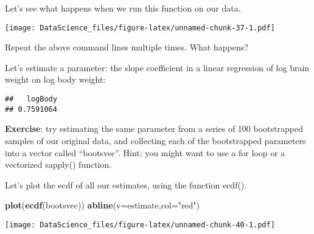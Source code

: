 \documentclass[
]{book}
\newenvironment{Shaded}{\begin{snugshade}}{\end{snugshade}}
\newcommand{\DataTypeTok}[1]{\textcolor[rgb]{0.13,0.29,0.53}{#1}}
\newcommand{\DecValTok}[1]{\textcolor[rgb]{0.00,0.00,0.81}{#1}}
\newcommand{\KeywordTok}[1]{\textcolor[rgb]{0.13,0.29,0.53}{\textbf{#1}}}
\newcommand{\NormalTok}[1]{#1}
\newcommand{\OperatorTok}[1]{\textcolor[rgb]{0.81,0.36,0.00}{\textbf{#1}}}
\newcommand{\StringTok}[1]{\textcolor[rgb]{0.31,0.60,0.02}{#1}}
\begin{document}
Let's see what happens when we run this function on our data.

\begin{Shaded}
\end{Shaded}

\texttt{[image: DataScience\_files/figure-latex/unnamed-chunk-37-1.pdf]}

Repeat the above command lines multiple times. What happens?

Let's estimate a parameter: the slope coefficient in a linear regression of log brain weight on log body weight:

\begin{Shaded}
\end{Shaded}

\begin{verbatim}
##   logBody 
## 0.7591064
\end{verbatim}

\textbf{Exercise}: try estimating the same parameter from a series of 100 bootstrapped samples of our original data, and collecting each of the bootstrapped parameters into a vector called ``bootsvec''. Hint: you might want to use a for loop or a vectorized sapply() function.

Let's plot the ecdf of all our estimates, using the function ecdf().

\begin{Shaded}
\begin{Highlighting}[]
\KeywordTok{plot}\NormalTok{(}\KeywordTok{ecdf}\NormalTok{(bootsvec))}
\KeywordTok{abline}\NormalTok{(}\DataTypeTok{v=}\NormalTok{estimate,}\DataTypeTok{col=}\StringTok{"red"}\NormalTok{)}
\end{Highlighting}
\end{Shaded}

\texttt{[image: DataScience\_files/figure-latex/unnamed-chunk-40-1.pdf]}
\end{document}
